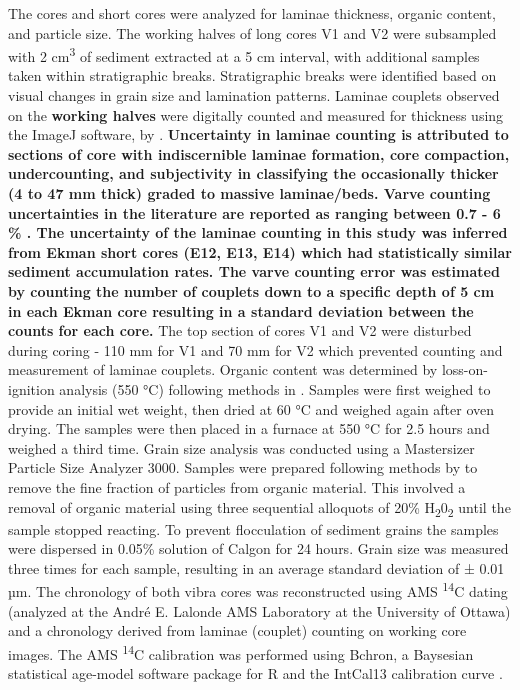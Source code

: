 \documentclass[Royal,times,doublespace,sageh]{sagej}
\begin{document}
The cores and short cores were analyzed for laminae thickness, organic
content, and particle size. The working halves of long cores V1 and V2
were subsampled with 2 cm\textsuperscript{3} of sediment extracted at a
5 cm interval, with additional samples taken within stratigraphic
breaks. Stratigraphic breaks were identified based on visual changes in
grain size and lamination patterns. Laminae couplets observed on the
\textbf{working halves} were digitally counted and measured for
thickness using the ImageJ software, by \citet{Schneider2012}.
\textbf{Uncertainty in laminae counting is attributed to sections of
core with indiscernible laminae formation, core compaction,
undercounting, and subjectivity in classifying the occasionally thicker
(4 to 47 mm thick) graded to massive laminae/beds. Varve counting
uncertainties in the literature are reported as ranging between 0.7 - 6
\% \citep{Menounos2008c, Zolitschka1991}. The uncertainty of the laminae
counting in this study was inferred from Ekman short cores (E12, E13,
E14) which had statistically similar sediment accumulation rates. The
varve counting error was estimated by counting the number of couplets
down to a specific depth of 5 cm in each Ekman core resulting in a
standard deviation between the counts for each core.} The top section of
cores V1 and V2 were disturbed during coring - 110 mm for V1 and 70 mm
for V2 which prevented counting and measurement of laminae couplets.
Organic content was determined by loss-on-ignition analysis (550 °C)
following methods in \citet{Smith2003}. Samples were first weighed to
provide an initial wet weight, then dried at 60 °C and weighed again
after oven drying. The samples were then placed in a furnace at 550 °C
for 2.5 hours and weighed a third time. Grain size analysis was
conducted using a Mastersizer Particle Size Analyzer 3000. Samples were
prepared following methods by \citet{Gray2010} to remove the fine
fraction of particles from organic material. This involved a removal of
organic material using three sequential alloquots of 20\%
H\textsubscript{2}0\textsubscript{2} until the sample stopped reacting.
To prevent flocculation of sediment grains the samples were dispersed in
0.05\% solution of Calgon for 24 hours. Grain size was measured three
times for each sample, resulting in an average standard deviation of ±
0.01 µm. The chronology of both vibra cores was reconstructed using AMS
\textsuperscript{14}C dating (analyzed at the André E. Lalonde AMS
Laboratory at the University of Ottawa) and a chronology derived from
laminae (couplet) counting on working core images. The AMS
\textsuperscript{14}C calibration was performed using Bchron, a
Baysesian statistical age-model software package for R
\citep{Parnell2008, Parnell2011, Haslett2008} and the IntCal13
calibration curve \citep{Reimer2013}.
\end{document}
